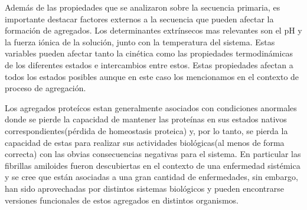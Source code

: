 Además de las propiedades que se analizaron sobre la secuencia primaria, es importante destacar factores externos a la secuencia que pueden afectar la formación de agregados.
Los determinantes extrínsecos mas relevantes son el pH y la fuerza iónica de la solución, junto con la temperatura del sistema.
Estas variables pueden afectar tanto la cinética como las propiedades termodinámicas de los diferentes estados e intercambios entre estos.
Estas propiedades afectan a todos los estados posibles aunque en este caso los mencionamos en el contexto de proceso de agregación.





Los agregados proteícos estan generalmente asociados con condiciones anormales donde se pierde la capacidad de mantener las proteínas en sus estados nativos correspondientes(pérdida de homeostasis proteica) y, por lo tanto, 
se pierda la capacidad de estas para realizar sus actividades biológicas(al menos de forma correcta) con las obvias consecuencias negativas para el sistema. 
En particular las fibrillas amiloides fueron descubiertas en el contexto de una enfermedad sistémica y se cree que están asociadas a una gran cantidad de enfermedades, sin embargo,
han sido aprovechadas por distintos sistemas biológicos y pueden encontrarse versiones funcionales de estos agregados en distintos organismos\cite{fowler2007functional}.











